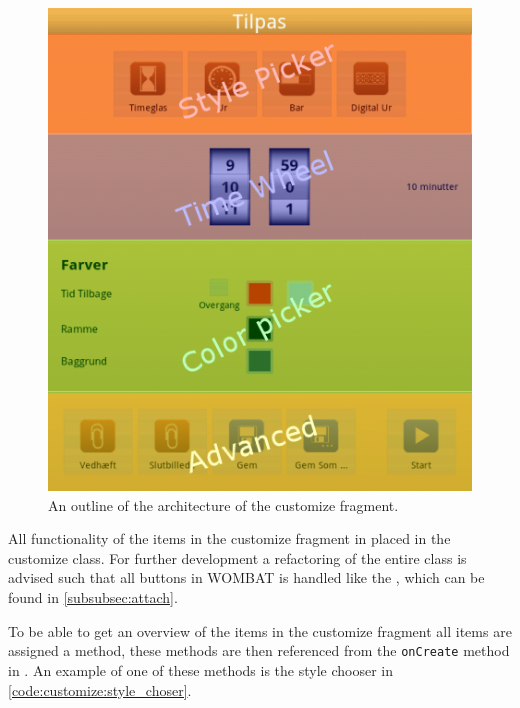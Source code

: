 \begin{figure}[H]
	\centering
		\includegraphics[width=\textwidth]{Images/Implementation/customize_layout.png}
	\caption{An outline of the architecture of the customize fragment.}
	\label{fig:customize:layout}
\end{figure}

All functionality of the items in the customize fragment in placed in the customize class.
For further development a refactoring of the entire class is advised such that all buttons in WOMBAT is handled like the , which can be found in \autoref{subsubsec:attach}.

To be able to get an overview of the items in the customize fragment all items are assigned a method, these methods are then referenced from the \texttt{onCreate} method in . An example of one of these methods is the style chooser in \autoref{code:customize:style_choser}.

